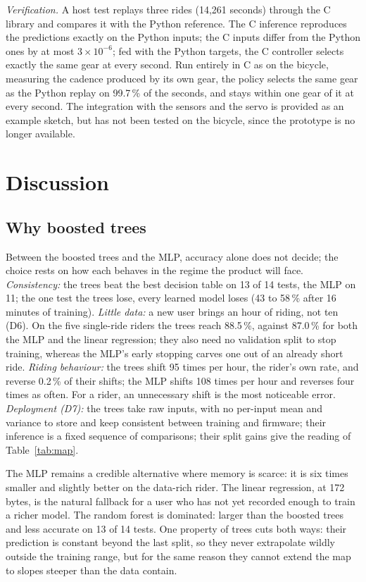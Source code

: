 \documentclass[conference]{IEEEtran}
\newcommand{\pct}{\,\%}
\begin{document}
\emph{Verification.} A host test replays three rides (14,261 seconds) through the C library and compares it with the Python reference. The C inference reproduces the predictions exactly on the Python inputs; the C inputs differ from the Python ones by at most $3\times10^{-6}$; fed with the Python targets, the C controller selects exactly the same gear at every second. Run entirely in C as on the bicycle, measuring the cadence produced by its own gear, the policy selects the same gear as the Python replay on 99.7\pct{} of the seconds, and stays within one gear of it at every second. The integration with the sensors and the servo is provided as an example sketch, but has not been tested on the bicycle, since the prototype is no longer available.

\section{Discussion}\label{sec:discussion}
\subsection{Why boosted trees}
Between the boosted trees and the MLP, accuracy alone does not decide; the choice rests on how each behaves in the regime the product will face. \emph{Consistency:} the trees beat the best decision table on 13 of 14 tests, the MLP on 11; the one test the trees lose, every learned model loses (43 to 58\pct{} after 16 minutes of training). \emph{Little data:} a new user brings an hour of riding, not ten (D6). On the five single-ride riders the trees reach 88.5\pct{}, against 87.0\pct{} for both the MLP and the linear regression; they also need no validation split to stop training, whereas the MLP's early stopping carves one out of an already short ride. \emph{Riding behaviour:} the trees shift 95 times per hour, the rider's own rate, and reverse 0.2\pct{} of their shifts; the MLP shifts 108 times per hour and reverses four times as often. For a rider, an unnecessary shift is the most noticeable error. \emph{Deployment (D7):} the trees take raw inputs, with no per-input mean and variance to store and keep consistent between training and firmware; their inference is a fixed sequence of comparisons; their split gains give the reading of Table~\ref{tab:map}.

The MLP remains a credible alternative where memory is scarce: it is six times smaller and slightly better on the data-rich rider. The linear regression, at 172 bytes, is the natural fallback for a user who has not yet recorded enough to train a richer model. The random forest is dominated: larger than the boosted trees and less accurate on 13 of 14 tests. One property of trees cuts both ways: their prediction is constant beyond the last split, so they never extrapolate wildly outside the training range, but for the same reason they cannot extend the map to slopes steeper than the data contain.
\end{document}
